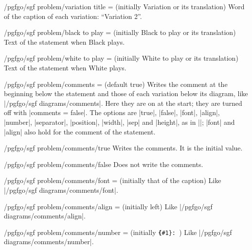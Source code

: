 \begin{key}{/pgfgo/sgf problem/variation title =  (initially Variation or its translation)}
	Word of the caption of each variation: ``Variation 2''.
\end{key}

\begin{key}{/pgfgo/sgf problem/black to play =  (initially Black to play or its translation)}
	Text of the statement when Black plays.
\end{key}

\begin{key}{/pgfgo/sgf problem/white to play =  (initially White to play or its translation)}
	Text of the statement when White plays.
\end{key}

\begin{key}{/pgfgo/sgf problem/comments =  (default true)}
	Writes the comment at the beginning below the statement and those of each variation below its diagram, like |/pgfgo/sgf diagrams/comments|. Here they are on at the start; they are turned off with |comments = false|. The options are |true|, |false|, |font|, |align|, |number|, |separator|, |position|, |width|, |sep| and |height|, as in |\sgfdiagrams|; |font| and |align| also hold for the comment of the statement.
\end{key}

\begin{stylekey}{/pgfgo/sgf problem/comments/true}
	Writes the comments. It is the initial value.
\end{stylekey}

\begin{stylekey}{/pgfgo/sgf problem/comments/false}
	Does not write the comments.
\end{stylekey}

\begin{key}{/pgfgo/sgf problem/comments/font =  (initially that of the caption)}
	Like |/pgfgo/sgf diagrams/comments/font|.
\end{key}

\begin{key}{/pgfgo/sgf problem/comments/align =  (initially left)}
	Like |/pgfgo/sgf diagrams/comments/align|.
\end{key}

\begin{key}{/pgfgo/sgf problem/comments/number =  (initially \texttt{\string\textbf\{\#1\}:\string~})}
	Like |/pgfgo/sgf diagrams/comments/number|.
\end{key}

